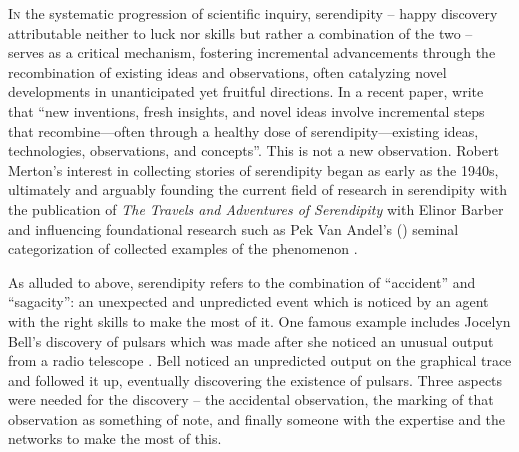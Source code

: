 \documentclass[authordate, empirical]{jote-new-article}
\author[1]{\mbox{Wendy Ross}}
\affil[1]{London Metropolitan \mbox{University}}
\author[2]{\mbox{Samantha Copeland\orcid{0000-0002-6946-7165}}}
\affil[2]{Delft University \mbox{of Technology}}
\author[3]{\mbox{Stuart Firestein\orcid{0000-0003-1774-5853}}}
\affil[3]{Columbia University}
\begin{document}
\begin{frontmatter}
  \maketitle
  \begin{abstract}
    \printabstracttext
  \end{abstract}
\end{frontmatter}


\lettrine{I}{n} the systematic progression of scientific inquiry, serendipity -- happy discovery attributable neither to luck nor skills but rather a combination of the two -- serves as a critical mechanism, fostering incremental advancements through the recombination of existing ideas and observations, often catalyzing novel developments in unanticipated yet fruitful directions. In a recent paper, \textcites[][p. 2]{Henrich2023} write that “new inventions, fresh insights, and novel ideas involve incremental steps that recombine—often through a healthy dose of serendipity—existing ideas, technologies, observations, and concepts”. This is not a new observation. Robert Merton's interest in collecting stories of serendipity began as early as the 1940s, ultimately and arguably founding the current field of research in serendipity with the publication of \emph{The Travels and Adventures of Serendipity }with Elinor Barber \parencites{Merton2004}{Yaqub2018} and influencing foundational research such as Pek Van Andel's (\hspace*{-2pt}\citeyear{VanAndel1994}) seminal categorization of collected examples of the phenomenon \parencites{foster2003serendipity}.



As alluded to above, serendipity refers to the combination of “accident” and “sagacity”: an unexpected and unpredicted event which is noticed by an agent with the right skills to make the most of it. One famous example includes Jocelyn Bell's discovery of pulsars which was made after she noticed an unusual output from a radio telescope \parencites{Arfini2023}. Bell noticed an unpredicted output on the graphical trace and followed it up, eventually discovering the existence of pulsars. Three aspects were needed for the discovery -- the accidental observation, the marking of that observation as something of note, and finally someone with the expertise and the networks to make the most of this.
\end{document}
